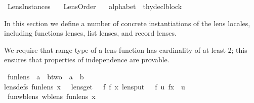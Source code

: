 %
\begin{isabellebody}%
%
%
\isamarkuptrue%
%
\isadelimtheory
%
\endisadelimtheory
%
\isatagtheory
{}\isamarkupfalse%
\ Lens{\isacharunderscore}Instances\isanewline
\ \ \ Lens{\isacharunderscore}Order\isanewline
\ \ \ {\isachardoublequoteopen}alphabet{\isachardoublequoteclose}\ {\isacharcolon}{\isacharcolon}\ {\isachardoublequoteopen}thy{\isacharunderscore}decl{\isacharunderscore}block{\isachardoublequoteclose}\isanewline
{}%
\endisatagtheory
{\isafoldtheory}%
%
\isadelimtheory
%
\endisadelimtheory
%
\begin{isamarkuptext}%
In this section we define a number of concrete instantiations of the lens locales, including
  functions lenses, list lenses, and record lenses.%
\end{isamarkuptext}\isamarkuptrue%
%
\isamarkuptrue%
%
\begin{isamarkuptext}%
We require that range type of a lens function has cardinality of at least 2; this ensures
      that properties of independence are provable.%
\end{isamarkuptext}\isamarkuptrue%
\isamarkupfalse%
\ fun{\isacharunderscore}lens\ {\isacharcolon}{\isacharcolon}\ {\isachardoublequoteopen}{\isacharprime}a\ {\isasymRightarrow}\ {\isacharparenleft}{\isacharprime}b{\isacharcolon}{\isacharcolon}two\ {\isasymLongrightarrow}\ {\isacharparenleft}{\isacharprime}a\ {\isasymRightarrow}\ {\isacharprime}b{\isacharparenright}{\isacharparenright}{\isachardoublequoteclose}\ \isanewline
{\isacharbrackleft}lens{\isacharunderscore}defs{\isacharbrackright}{\isacharcolon}\ {\isachardoublequoteopen}fun{\isacharunderscore}lens\ x\ {\isacharequal}\ {\isasymlparr}\ lens{\isacharunderscore}get\ {\isacharequal}\ {\isacharparenleft}{\isasymlambda}\ f{\isachardot}\ f\ x{\isacharparenright}{\isacharcomma}\ lens{\isacharunderscore}put\ {\isacharequal}\ {\isacharparenleft}{\isasymlambda}\ f\ u{\isachardot}\ f{\isacharparenleft}x\ {\isacharcolon}{\isacharequal}\ u{\isacharparenright}{\isacharparenright}\ {\isasymrparr}{\isachardoublequoteclose}\isanewline
\isanewline
{}\isamarkupfalse%
\ fun{\isacharunderscore}wb{\isacharunderscore}lens{\isacharcolon}\ {\isachardoublequoteopen}wb{\isacharunderscore}lens\ {\isacharparenleft}fun{\isacharunderscore}lens\ x{\isacharparenright}{\isachardoublequoteclose}\isanewline

\end{isabellebody}

